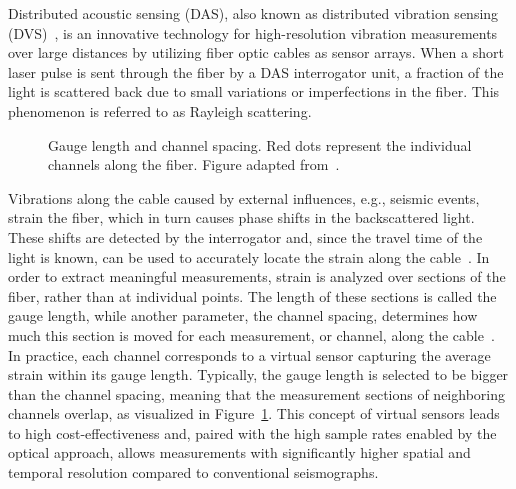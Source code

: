 Distributed acoustic sensing (DAS), also known as distributed vibration sensing (DVS)~\cite{DAS}, is an innovative technology for high-resolution vibration measurements over large distances by utilizing fiber optic cables as sensor arrays.
When a short laser pulse is sent through the fiber by a DAS interrogator unit, a fraction of the light is scattered back due to small variations or imperfections in the fiber.
This phenomenon is referred to as Rayleigh scattering.
\begin{figure}
    \centering

    \caption{
        Gauge length and channel spacing. Red dots represent the individual channels along the fiber.
        Figure adapted from~\cite{GaugeLength}.
    }\label{fig:gauge-length}
\end{figure}
Vibrations along the cable caused by external influences, e.g., seismic events, strain the fiber, which in turn causes phase shifts in the backscattered light.
These shifts are detected by the interrogator and, since the travel time of the light is known, can be used to accurately locate the strain along the cable~\cite{DAS-N2N}.
In order to extract meaningful measurements, strain is analyzed over sections of the fiber, rather than at individual points.
The length of these sections is called the gauge length, while another parameter, the channel spacing, determines how much this section is moved for each measurement, or channel, along the cable~\cite{GaugeLength}.
In practice, each channel corresponds to a virtual sensor capturing the average strain within its gauge length.
Typically, the gauge length is selected to be bigger than the channel spacing, meaning that the measurement sections of neighboring channels overlap, as visualized in Figure~\ref{fig:gauge-length}.
This concept of virtual sensors leads to high cost-effectiveness and, paired with the high sample rates enabled by the optical approach, allows measurements with significantly higher spatial and temporal resolution compared to conventional seismographs.

